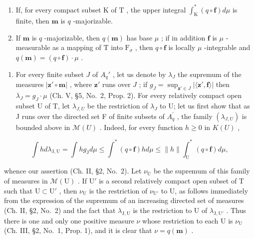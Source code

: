 \begin{enumerate}
\def\labelenumi{\alph{enumi})}
\item
  If, for every compact subset \(\mathrm{K}\) of \(\mathrm{T}\) , the upper integral \(\int_{\mathrm{K}}^{*}(q \circ \mathbf{f}) d\mu\) is finite, then \(\mathbf{m}\) is \(q\) -majorizable.
\item
  If \(\mathbf{m}\) is \(q\) -majorizable, then \(q(\mathbf{m})\) has base \(\mu\) ; if in addition \(\mathbf{f}\) is \(\mu\) -measurable as a mapping of \(\mathrm{T}\) into \(\mathrm{F}_{\sigma}\) , then \(q \circ \mathbf{f}\) is locally \(\mu\) -integrable and \(q(\mathbf{m}) = (q \circ \mathbf{f}) \cdot \mu\) .
\end{enumerate}

\begin{enumerate}
\def\labelenumi{\alph{enumi})}
\tightlist
\item
  For every finite subset \(J\) of \(A_q'\) , let us denote by \(\lambda_J\) the supremum of the measures \(|\mathbf{z}' \circ \mathbf{m}|\) , where \(\mathbf{z}'\) runs over \(J\) ; if \(g_J = \sup_{\mathbf{z}' \in J} |\langle \mathbf{z}', \mathbf{f} \rangle|\) then \(\lambda_{J}=g_{J}\cdot\mu\) (Ch. V, §5, No.~2, Prop. 2). For every relatively compact open subset U of T, let \(\lambda_{J,U}\) be the restriction of \(\lambda_{J}\) to U; let us first show that as J runs over the directed set F of finite subsets of \(A_{q}^{\prime}\) , the family \((\lambda_{J,U})\) is bounded above in \(\mathcal{M}(U)\) . Indeed, for every function \(h\geqslant0\) in \(K(U)\) ,
\end{enumerate}

\[
\int h d \lambda_ {\mathrm{J}, \mathrm{U}} = \int h g _ {\mathrm{J}} d \mu \leqslant \int^ {*} (q \circ \mathbf {f}) h d \mu \leqslant \| h \| \int_ {\mathrm{U}} ^ {*} (q \circ \mathbf {f}) d \mu ,
\]

whence our assertion (Ch. II, §2, No.~2). Let \(\nu_{\mathrm{U}}\) be the supremum of this family of measures in \(\mathcal{M}(\mathrm{U})\) . If \(\mathrm{U}'\) is a second relatively compact open subset of T such that \(\mathrm{U} \subset \mathrm{U}'\) , then \(\nu_{\mathrm{U}}\) is the restriction of \(\nu_{\mathrm{U}'}\) to U, as follows immediately from the expression of the supremum of an increasing directed set of measures (Ch. II, §2, No.~2) and the fact that \(\lambda_{\mathrm{J,U}}\) is the restriction to U of \(\lambda_{\mathrm{J,U}'}\) . Thus there is one and only one positive measure \(\nu\) whose restriction to each U is \(\nu_{\mathrm{U}}\) (Ch. III, §2, No.~1, Prop. 1), and it is clear that \(\nu = q(\mathbf{m})\) .

